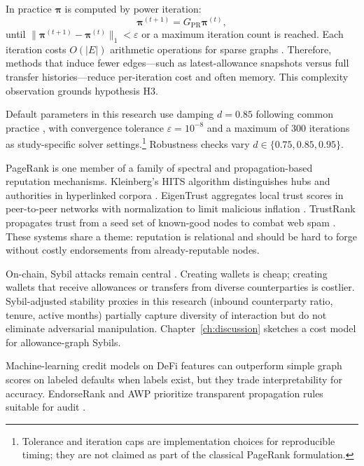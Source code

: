 
In practice $\boldsymbol{\pi}$ is computed by power iteration:
\begin{equation}
\boldsymbol{\pi}^{(t+1)} = G_{\mathrm{PR}}\boldsymbol{\pi}^{(t)},
\label{eq:power-iteration}
\end{equation}
until $\|\boldsymbol{\pi}^{(t+1)}-\boldsymbol{\pi}^{(t)}\|_1 < \varepsilon$ or a maximum iteration count is reached. Each iteration costs $O(|E|)$ arithmetic operations for sparse graphs . Therefore, methods that induce fewer edges---such as latest-allowance snapshots versus full transfer histories---reduce per-iteration cost and often memory. This complexity observation grounds hypothesis H3.

Default parameters in this research use damping $d=0.85$ following common practice , with convergence tolerance $\varepsilon=10^{-8}$ and a maximum of $300$ iterations as study-specific solver settings.\footnote{Tolerance and iteration caps are implementation choices for reproducible timing; they are not claimed as part of the classical PageRank formulation.} Robustness checks vary $d\in\{0.75,0.85,0.95\}$.


PageRank is one member of a family of spectral and propagation-based reputation mechanisms. Kleinberg's HITS algorithm distinguishes hubs and authorities in hyperlinked corpora . EigenTrust aggregates local trust scores in peer-to-peer networks with normalization to limit malicious inflation . TrustRank propagates trust from a seed set of known-good nodes to combat web spam . These systems share a theme: reputation is relational and should be hard to forge without costly endorsements from already-reputable nodes.

On-chain, Sybil attacks remain central . Creating wallets is cheap; creating wallets that receive allowances or transfers from diverse counterparties is costlier. Sybil-adjusted stability proxies in this research (inbound counterparty ratio, tenure, active months) partially capture diversity of interaction but do not eliminate adversarial manipulation. Chapter~\ref{ch:discussion} sketches a cost model for allowance-graph Sybils.

Machine-learning credit models on DeFi features  can outperform simple graph scores on labeled defaults when labels exist, but they trade interpretability for accuracy. EndorseRank and AWP prioritize transparent propagation rules suitable for audit .

